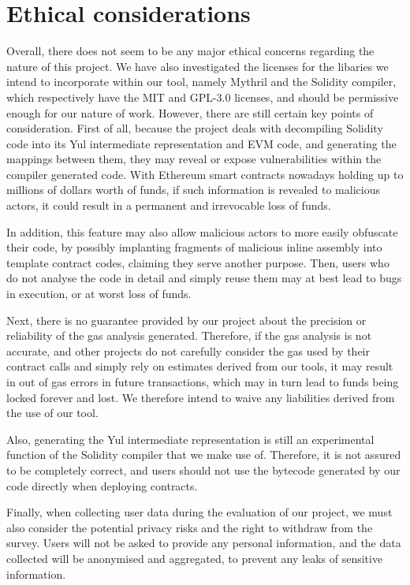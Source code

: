 \chapter{Ethical considerations}
\label{chap:ethics}

Overall, there does not seem to be any major ethical concerns regarding the nature of 
this project. We have also investigated the licenses for the libaries we intend to incorporate
within our tool, namely Mythril and the Solidity compiler, which respectively have the MIT and GPL-3.0
licenses, and should be permissive enough for our nature of work. However, there are still certain key points of consideration. First of all,
because the project deals with decompiling Solidity code into its Yul intermediate
representation and EVM code, and generating the mappings between them, they may reveal or
expose vulnerabilities within the compiler generated code. With Ethereum smart contracts 
nowadays holding up to millions of dollars worth of funds, if such information is revealed
to malicious actors, it could result in a permanent and irrevocable loss of funds.

In addition, this feature may also allow malicious actors to more easily obfuscate their code,
by possibly implanting fragments of malicious inline assembly into template contract codes,
claiming they serve another purpose. Then, users who do not analyse the code in detail and
simply reuse them may at best lead to bugs in execution, or at worst loss of funds.

Next, there is no guarantee provided by our project about the precision or reliability
of the gas analysis generated. Therefore, if the gas analysis is not accurate, and other projects
do not carefully consider the gas used by their contract calls and simply rely on estimates derived
from our tools, it may result in out of gas errors in future transactions, which may in turn
lead to funds being locked forever and lost. We therefore intend to waive any liabilities derived
from the use of our tool.

Also, generating the Yul intermediate representation is still an experimental function of
the Solidity compiler that we make use of. Therefore, it is not assured to be completely
correct, and users should not use the bytecode generated by our code directly when
deploying contracts.

Finally, when collecting user data during the evaluation of our project, we must also consider
the potential privacy risks and the right to withdraw from the survey. Users will not be asked to 
provide any personal information, and the data collected will be anonymised and aggregated, to
prevent any leaks of sensitive information.